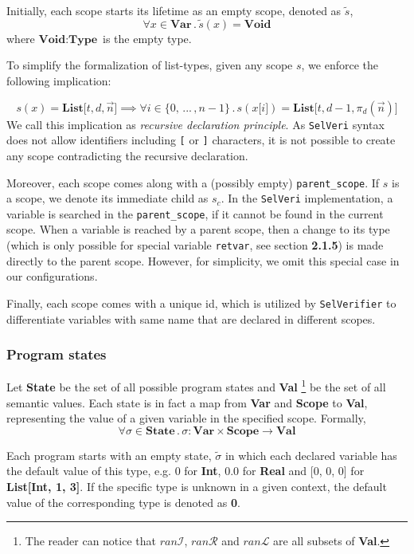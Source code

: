 \documentclass{article}
\begin{document}
Initially, each scope starts its lifetime as an empty scope, denoted as $\tilde{s}$, 
\[
\forall x \in \textbf{Var} \, . \,\tilde{s}(x) = \textbf{Void}
\]
where $\textbf{Void} : \textbf{Type}$ is the empty type.

To simplify the formalization of list-types, given any scope $s$, we enforce the following implication:

\[
s(x) = \textbf{List[$t,d,\vec{n}$]}
\implies
\forall i \in \{0, \,...\, , n-1\} \,.\, s(x\texttt{[$i$]}) = \textbf{List[$t, d-1, \pi_d(\vec{n})$]}
\]
We call this implication as \textit{recursive declaration principle}. As \texttt{SelVeri} syntax does not allow identifiers including \texttt{[} or \texttt{]} characters, it is not possible to create any scope contradicting the recursive declaration.

Moreover, each scope comes along with a (possibly empty) \texttt{parent\_scope}. If $s$ is a scope, we denote its immediate child as $s_c$. In the \texttt{SelVeri} implementation, a variable is searched in the \texttt{parent\_scope}, if it cannot be found in the current scope. When a variable is reached by a parent scope, then a change to its type (which is only possible for special variable \texttt{retvar}, see section \textbf{2.1.5}) is made directly to the parent scope. However, for simplicity, we omit this special case in our configurations.

Finally, each scope comes with a unique id, which is utilized by \texttt{SelVerifier} to differentiate variables with same name that are declared in different scopes.

\newpage
\subsubsection{Program states}

Let \textbf{State} be the set of all possible program states and \textbf{Val} \footnote{The reader can notice that $ran\mathcal{I}$, $ran\mathcal{R}$ and $ran\mathcal{L}$ are all subsets of \textbf{Val}.} be the set of all semantic values. Each state is in fact a map from \textbf{Var} and \textbf{Scope} to \textbf{Val}, representing the value of a given variable in the specified scope. Formally,
\[
\forall \sigma \in \textbf{State} \, . \, \sigma: \textbf{Var} \times \textbf{Scope} \rightarrow \textbf{Val}
\]

Each program starts with an empty state, $\tilde{\sigma}$ in which each declared variable has the default value of this type, e.g. 0 for \textbf{Int}, 0.0 for \textbf{Real} and  [0, 0, 0] for \textbf{List[Int, 1, 3]}. If the specific type is unknown in a given context, the default value of the corresponding type is denoted as \textbf{0}.
\end{document}
